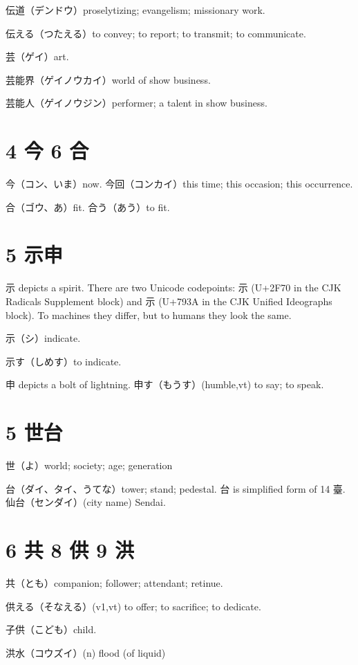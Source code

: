伝道（デンドウ）proselytizing; evangelism; missionary work.

伝える（つたえる）to convey; to report; to transmit; to communicate.

芸（ゲイ）art.

芸能界（ゲイノウカイ）world of show business.

芸能人（ゲイノウジン）performer; a talent in show business.

\section{4 今 6 合}

今（コン、いま）now.
今回（コンカイ）this time; this occasion; this occurrence.

合（ゴウ、あ）fit.
合う（あう）to fit.

\section{5 示申}

示 depicts a spirit.
There are two Unicode codepoints:
⽰ (U+2F70 in the CJK Radicals Supplement block)
and 示 (U+793A in the CJK Unified Ideographs block).
To machines they differ,
but to humans they look the same.

示（シ）indicate.

示す（しめす）to indicate.

申 depicts a bolt of lightning.
申す（もうす）(humble,vt) to say; to speak.

\section{5 世台}

世（よ）world; society; age; generation

台（ダイ、タイ、うてな）tower; stand; pedestal.
台 is simplified form of 14 臺.
仙台（センダイ）(city name) Sendai.

\section{6 共 8 供 9 洪}

共（とも）companion; follower; attendant; retinue.

供える（そなえる）(v1,vt) to offer; to sacrifice; to dedicate.

子供（こども）child.

洪水（コウズイ）(n) flood (of liquid)

